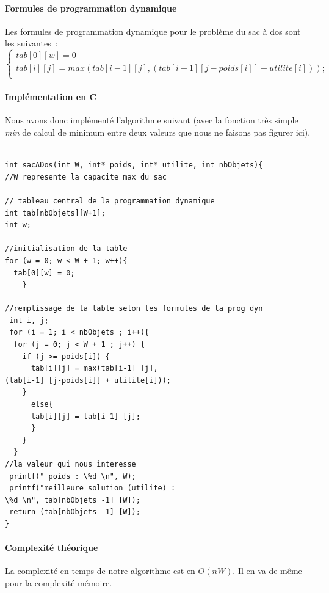\documentclass[a4paper, 12pt]{article}
\begin{document}
\paragraph{Formules de programmation dynamique}

Les formules de programmation dynamique pour le problème du sac à dos
sont les suivantes~:
\begin{equation}
\begin{cases}
tab[0][w] = 0 \\
tab[i][j] = max(tab[i-1] [j], (tab[i-1] [j-poids[i]] + utilite[i])); \\
\end{cases}
\end{equation}

\paragraph{Implémentation en C}

Nous avons donc implémenté l'algorithme suivant (avec la fonction très
simple \textit{min} de calcul de minimum entre deux valeurs que nous
ne faisons pas figurer ici).

\begin{lstlisting}

int sacADos(int W, int* poids, int* utilite, int nbObjets){ 
//W represente la capacite max du sac

// tableau central de la programmation dynamique
int tab[nbObjets][W+1]; 
int w;

//initialisation de la table
for (w = 0; w < W + 1; w++){
  tab[0][w] = 0;
    }

//remplissage de la table selon les formules de la prog dyn
 int i, j;
 for (i = 1; i < nbObjets ; i++){
  for (j = 0; j < W + 1 ; j++) {
    if (j >= poids[i]) {
      tab[i][j] = max(tab[i-1] [j], 
(tab[i-1] [j-poids[i]] + utilite[i]));
    }
      else{
      tab[i][j] = tab[i-1] [j];
      }
    }
  }
//la valeur qui nous interesse
 printf(" poids : \%d \n", W);
 printf("meilleure solution (utilite) :
\%d \n", tab[nbObjets -1] [W]);
 return (tab[nbObjets -1] [W]);
}

\end{lstlisting}

\paragraph{Complexité théorique}

La complexité en temps de notre algorithme est en $O(nW)$. Il en va de
même pour la complexité mémoire.
\end{document}
